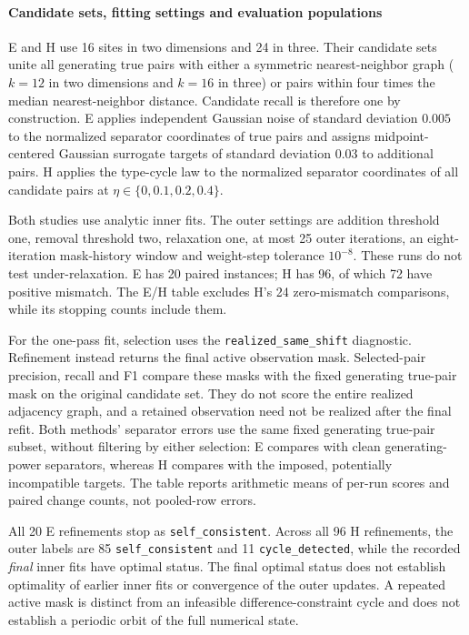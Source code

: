 \paragraph{Candidate sets, fitting settings and evaluation populations}
E and H use 16 sites in two dimensions and 24 in three. Their candidate sets
unite all generating true pairs with either a symmetric nearest-neighbor
graph ($k=12$ in two dimensions and $k=16$ in three) or pairs within four
times the median nearest-neighbor distance. Candidate recall is therefore
one by construction. E applies independent Gaussian noise of standard
deviation $0.005$ to the normalized separator coordinates of true pairs and
assigns midpoint-centered Gaussian surrogate targets of standard deviation
$0.03$ to additional pairs. H applies the type-cycle law to the normalized
separator coordinates of all candidate pairs at
$\eta\in\{0,0.1,0.2,0.4\}$.

Both studies use analytic inner fits. The outer settings are addition
threshold one, removal threshold two, relaxation one, at most 25 outer
iterations, an eight-iteration mask-history window and weight-step tolerance
$10^{-8}$. These runs do not test under-relaxation. E has 20 paired instances;
H has 96, of which 72 have positive mismatch. The E/H table excludes H's
24 zero-mismatch comparisons, while its stopping counts include them.

For the one-pass fit, selection uses the
\texttt{realized\_same\_shift} diagnostic. Refinement instead returns the
final active observation mask. Selected-pair precision, recall and F1 compare these masks
with the fixed generating true-pair mask on the original candidate set.
They do not score the entire realized adjacency graph, and a retained
observation need not be realized after the final refit. Both methods'
separator errors use the same fixed generating true-pair subset, without
filtering by either selection: E compares with clean generating-power
separators, whereas H compares with the imposed, potentially incompatible
targets. The table reports arithmetic means of per-run scores and paired
change counts, not pooled-row errors.

All 20 E refinements stop as \texttt{self\_consistent}. Across all 96 H
refinements, the outer labels are 85 \texttt{self\_consistent} and
11 \texttt{cycle\_detected}, while the recorded \emph{final} inner fits have
optimal status. The final optimal status does not establish optimality of earlier
inner fits or convergence of the outer updates. A repeated active mask is distinct
from an infeasible difference-constraint cycle and does not establish a
periodic orbit of the full numerical state.

